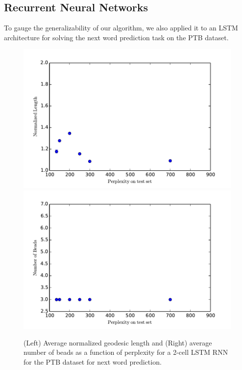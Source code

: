 \subsection{Recurrent Neural Networks}

 To gauge the generalizability of our algorithm, we also applied it to an LSTM architecture for solving the next word prediction task on the PTB dataset.

\begin{figure}
\label{PTBfigs}
\centering
\includegraphics[width=.4\textwidth]{../Plots/normlengthPTB}
\includegraphics[width=.4\textwidth]{../Plots/numbeadsPTB}
\caption{(Left) Average normalized geodesic length and (Right) average number of beads as a function of perplexity for a 2-cell LSTM RNN for the PTB dataset for next word prediction.}
\end{figure}


